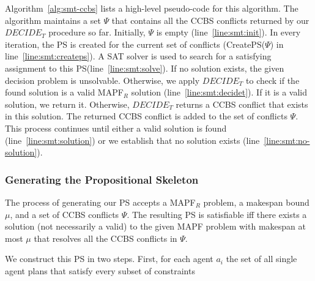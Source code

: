 \documentclass[review]{elsarticle}
\newcommand{\implicitct}{\textit{ImplicitCT}\xspace}
\newcommand{\decidet}{\ensuremath{\mathit{DECIDE_T}}\xspace}
\newcommand{\ccbs}{\ac{CCBS}\xspace}
\newcommand{\ct}{\ac{CT}\xspace}
\newcommand{\ps}{\ac{PS}\xspace}
\newcommand{\mapfr}{\ac{MAPF}$_R$\xspace}
\newcommand{\mapf}{\ac{MAPF}\xspace}
\begin{document}
Algorithm~\ref{alg:smt-ccbs} lists a high-level pseudo-code for this algorithm. 
The algorithm maintains a set $\Psi$ that contains all the \ccbs conflicts returned by our \decidet procedure so far. 
Initially, $\Psi$ is empty (line~\ref{line:smt:init}). 
In every iteration, the \ps is created for the current set of conflicts (CreatePS($\Psi$) in line~\ref{line:smt:createps}). 
A SAT solver is used to search for a satisfying assignment to this \ps (line~\ref{line:smt:solve}). 
If no solution exists, the given decision problem is unsolvable. 
Otherwise, we apply \decidet to check if the found solution is a valid \mapfr solution (line~\ref{line:smt:decidet}). 
If it is a valid solution, we return it.
Otherwise, \decidet returns a \ccbs conflict that exists in this solution. 
The returned \ccbs conflict is added to the set of conflicts $\Psi$. 
This process continues until either a valid solution is found (line~\ref{line:smt:solution}) or we establish that no solution exists (line~\ref{line:smt:no-solution}).





\subsubsection{Generating the Propositional Skeleton}
\label{sec:propositional-skeleton}




The process of generating our \ps accepts a \mapfr problem, a makespan bound $\mu$, and a set of \ccbs conflicts $\Psi$. The resulting \ps is satisfiable iff there exists a solution (not necessarily a valid) to the given \mapf problem with makespan at most $\mu$ that resolves all the \ccbs conflicts in $\Psi$. 








We construct this \ps in two steps. 
First, for each agent $a_i$ the set of all single agent plans that satisfy every subset of constraints 
\end{document}
